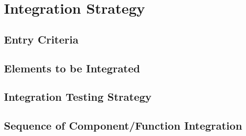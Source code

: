 \section{Integration Strategy}

\subsection{Entry Criteria}

\subsection{Elements to be Integrated}

\subsection{Integration Testing Strategy}

\subsection{Sequence of Component/Function Integration}